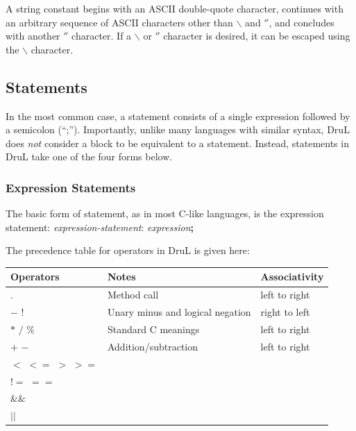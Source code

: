 \documentclass[11pt,twoside]{article}
\begin{document}
A string constant begins with an ASCII double-quote character, continues 
with an arbitrary sequence of ASCII characters other than $\backslash$ and $''$, 
and concludes with another $''$ character.  If a $\backslash$ or $''$ character is 
desired, it can be escaped using the $\backslash$ character.





\subsection{Statements}

In the most common case, a statement consists of a single expression followed by a semicolon (``;'').  Importantly, unlike many languages with similar syntax, DruL does \emph{not} consider a block to be equivalent to a statement.  Instead, statements in DruL take one of the four forms below.

\subsubsection{Expression Statements}

The basic form of statement, as in most C-like languages, is the expression statement: \emph{expression-statement}: \emph{expression}\textbf{;}

The precedence table for operators in DruL is given here:

\begin{tabular}{ l |l| l}
\hline\hline
Operators         & Notes                            & Associativity \\
\hline $ . $      & Method call                      & left to right \\
$-$  $!$          & Unary minus and logical negation & right to left \\
$*$ $/$ $\%$      & Standard C meanings              & left to right \\
$+$ $-$           & Addition/subtraction             & left to right \\
$<$ $<=$ $>$ $>=$ &                                  &               \\
$!=$ $==$         &                                  &               \\
$\&\&$            &                                  &               \\
$||$              &                                  &
\end{tabular}
\end{document}
